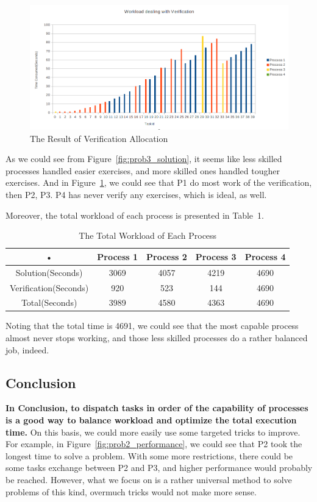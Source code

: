 \documentclass[a4paper]{article}   %
\begin{document}
\begin{CJK}{UTF8}{gbsn}
\begin{spacing}{1.2}
\begin{figure}[htbp]
\centering
\includegraphics[width=12cm]{figs/prob3_VerificationDistribution.png}
\caption{The Result of Verification Allocation}
\label{fig:prob3_verification}
\end{figure}

As we could see from Figure~\ref{fig:prob3_solution}, it seems like less skilled processes handled easier exercises, and more skilled ones handled tougher exercises. And in Figure~\ref{fig:prob3_verification}, we could see that P1 do most work of the verification, then P2, P3. P4 has never verify any exercises, which is ideal, as well.

Moreover, the total workload of each process is presented in Table~1.

\begin{table}[htbp]
\label{tab:prob3_workload}
\centering
\begin{tabular}{|c|c|c|c|c|}
\hline • & Process 1 & Process 2 & Process 3 & Process 4 \\ 
\hline Solution(Seconds) & 3069 & 4057 & 4219 & 4690 \\ 
\hline Verification(Seconds) & 920 & 523 & 144 & 4690 \\ 
\hline Total(Seconds) & 3989 & 4580 & 4363 & 4690 \\ 
\hline 
\end{tabular} 
\caption{The Total Workload of Each Process}
\end{table}

Noting that the total time is 4691, we could see that the most capable process almost never stops working, and those less skilled processes do a rather balanced job, indeed. 

\subsection{Conclusion}
\textbf{In Conclusion, to dispatch tasks in order of the capability of processes is a good way to balance workload and optimize the total execution time.} On this basis, we could more easily use some targeted tricks to improve. For example, in Figure~\ref{fig:prob2_performance}, we could see that P2 took the longest time to solve a problem. With some more restrictions, there could be some tasks exchange between P2 and P3, and higher performance would probably be reached. However, what we focus on is a rather universal method to solve problems of this kind, overmuch tricks would not make more sense.



\end{spacing}
\end{CJK}
\end{document}
